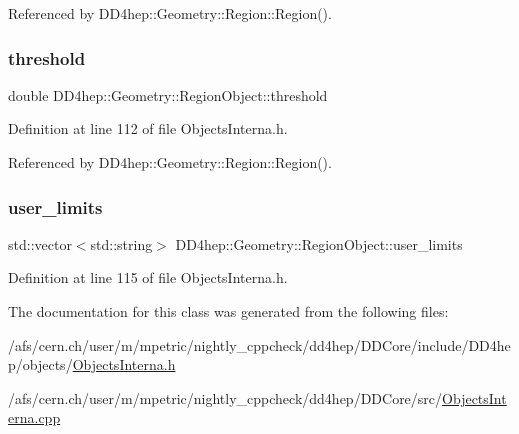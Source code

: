Referenced by D\+D4hep\+::\+Geometry\+::\+Region\+::\+Region().

\hypertarget{class_d_d4hep_1_1_geometry_1_1_region_object_a62b96102392556bd53f18a440dff1483}{}\label{class_d_d4hep_1_1_geometry_1_1_region_object_a62b96102392556bd53f18a440dff1483} 
\subsubsection{\texorpdfstring{threshold}{threshold}}
{\footnotesize\ttfamily double D\+D4hep\+::\+Geometry\+::\+Region\+Object\+::threshold}



Definition at line 112 of file Objects\+Interna.\+h.



Referenced by D\+D4hep\+::\+Geometry\+::\+Region\+::\+Region().

\hypertarget{class_d_d4hep_1_1_geometry_1_1_region_object_a6d6a6cffbfc5b1937b3b1c46e2580430}{}\label{class_d_d4hep_1_1_geometry_1_1_region_object_a6d6a6cffbfc5b1937b3b1c46e2580430} 
\subsubsection{\texorpdfstring{user\+\_\+limits}{user\_limits}}
{\footnotesize\ttfamily std\+::vector$<$std\+::string$>$ D\+D4hep\+::\+Geometry\+::\+Region\+Object\+::user\+\_\+limits}



Definition at line 115 of file Objects\+Interna.\+h.



The documentation for this class was generated from the following files\+:\begin{DoxyCompactItemize}
\item 
/afs/cern.\+ch/user/m/mpetric/nightly\+\_\+cppcheck/dd4hep/\+D\+D\+Core/include/\+D\+D4hep/objects/\hyperlink{_objects_interna_8h}{Objects\+Interna.\+h}\item 
/afs/cern.\+ch/user/m/mpetric/nightly\+\_\+cppcheck/dd4hep/\+D\+D\+Core/src/\hyperlink{_objects_interna_8cpp}{Objects\+Interna.\+cpp}\end{DoxyCompactItemize}
